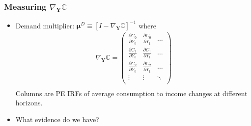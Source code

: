 \documentclass[english,xcolor=svgnames]{beamer}
\begin{document}
\begin{frame}
    \frametitle{Measuring $\nabla_{\bm{Y}}\pmb{\mathbb{C}}$}
    \begin{itemize}
        \item Demand multiplier: $\bm{\mu}^D \equiv [I - \nabla_{\bm{Y}}\pmb{\mathbb{C}}]^{-1}$
        where
        \begin{align*}
            \nabla_{\bm{Y}}\pmb{\mathbb{C}} = 
            \begin{pmatrix}
                \frac{\partial C_{0}}{\partial Y_0} & \frac{\partial C_{0}}{\partial Y_1} & \hdots \\
                \frac{\partial C_{1}}{\partial Y_0} & \frac{\partial C_{1}}{\partial Y_1} & \hdots \\
                \frac{\partial C_{2}}{\partial Y_0} & \frac{\partial C_{2}}{\partial Y_1} & \hdots \\
                \vdots & \vdots & \ddots \\
            \end{pmatrix}\\
        \end{align*}
        Columns are PE IRFs of average consumption to income changes at different horizons.
        \item What evidence do we have?
    \end{itemize}
\end{frame}
\end{document}
